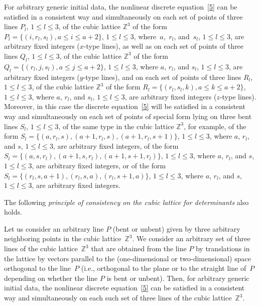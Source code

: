 \documentclass[pdftex]{sigma}
\begin{document}
\begin{theorem}[\cite{2}]\label{theorem2}
For arbitrary generic initial data, the
nonlinear discrete equation~\eqref{5} can be satisfied in a
consistent way and simultaneously on each set of points of three
lines $P_l$, $1 \leq l \leq 3$, of the cubic lattice $\mathbb{Z}^3$
of the form $P_l = \{(i, r_l, s_l), a \leq i \leq a + 2\}$, $1 \leq
l \leq 3$, where~$a$,~$r_l$, and~$s_l$, $1 \leq l \leq 3$, are
arbitrary fixed integers {\rm (}$x$-type lines{\rm )}, as well as on
each set of points of three lines $Q_l$, $1 \leq l \leq 3$, of the
cubic lattice $\mathbb{Z}^3$ of the form $Q_l = \{(r_l, j, s_l), a
\leq j \leq a + 2\}$, $1 \leq l \leq 3$, where $a$, $r_l$, and
$s_l$, $1 \leq l \leq 3$, are arbitrary fixed integers {\rm
(}$y$-type lines{\rm )}, and on each set of points of three lines
$R_l$, $1 \leq l \leq 3$, of the cubic lattice $\mathbb{Z}^3$ of the
form $R_l = \{(r_l, s_l, k), a \leq k \leq a + 2\}$, $1 \leq l \leq
3$, where $a$, $r_l$, and $s_l$, $1 \leq l \leq 3$, are arbitrary
fixed integers {\rm (}$z$-type lines{\rm )}. Moreover, in this case
the discrete equation~\eqref{5} will be satisfied in a
consistent way and simultaneously on each set of points of special
form lying on three bent lines $S_l$, $1 \leq l \leq 3$, of the same
type in the cubic lattice $\mathbb{Z}^3$, for example, of the form
$S_l = \{(a, r_l, s), (a + 1, r_l, s), (a + 1, r_l, s + 1)\}$, $1
\leq l \leq 3$, where $a$, $r_l$, and $s$, $1 \leq l \leq 3$, are
arbitrary fixed integers, of the form $S_l = \{(a, s, r_l), (a + 1,
s, r_l), (a + 1, s + 1, r_l)\}$, $1 \leq l \leq 3$, where $a$,
$r_l$, and $s$, $1 \leq l \leq 3$, are arbitrary fixed integers, or
of the form $S_l = \{(r_l, s, a + 1), (r_l, s, a), (r_l, s + 1,
a)\}$, $1 \leq l \leq 3$, where $a$, $r_l$, and $s$, $1 \leq l \leq
3$, are arbitrary fixed integers.
\end{theorem}


The following {\it principle of consistency on the cubic lattice for
determinants} also holds.


Let us consider an arbitrary line $P$ (bent or unbent) given by
three arbitrary neighboring points in the cubic lattice~$\mathbb{Z}^3$. We consider an arbitrary set of three lines of the
cubic lattice~$\mathbb{Z}^3$ that are obtained from the line $P$ by
translations in the lattice by vectors parallel to the
(one-dimensional or two-dimensional) space orthogonal to the line~$P$ (i.e., orthogonal to the plane or to the straight line of~$P$
depending on whether the line $P$ is bent or unbent). Then, for
arbitrary generic initial data, the nonlinear discrete equation~\eqref{5}
can be satisf\/ied in a consistent way and simultaneously
on each such set of three lines of the cubic lattice~$\mathbb{Z}^3$.
\end{document}
